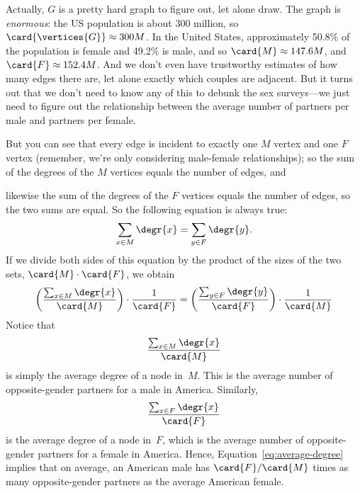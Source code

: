 Actually, $G$ is a pretty hard graph to figure out, let alone draw.  The
graph is \emph{enormous}: the US population is about 300 million, so
$\card{\vertices{G}} \approx 300M$.  In the United States, approximately
50.8\% of the population is female and 49.2\% is male, and so $\card{M}
\approx 147.6M$, and $\card{F} \approx 152.4M$.  And we don't even have
trustworthy estimates of how many edges there are, let alone exactly which
couples are adjacent.  But it turns out that we don't need to know any of
this to debunk the sex surveys---we just need to figure out the
relationship between the average number of partners per male and partners
per female.
\begin{editingnotes}
\end{editingnotes}
But you can see that every edge is incident
to exactly one $M$ vertex and one $F$ vertex (remember, we're only
considering male-female relationships); so the sum of the degrees of the
$M$ vertices equals the number of edges, and
\begin{editingnotes}
\end{editingnotes}
likewise
the sum of the degrees of the $F$ vertices equals the number of edges, so
the two sums are equal.  So the following equation is always true:
%
\[
\sum_{x \in M} \degr{x} = \sum_{y \in F} \degr{y}.
\]
%
If we divide both sides of this equation by the product of the sizes
of the two sets, $\card{M} \cdot \card{F}$, we obtain
%
\begin{equation}\label{eq:average-degree}
\left(\frac{\sum_{x \in M} \degr{x}}{\card{M}}\right) \cdot \frac{1}{\card{F}} =
\left(\frac{\sum_{y \in F} \degr{y}}{\card{F}}\right) \cdot \frac{1}{\card{M}}
\end{equation}
Notice that
\begin{equation*}
    \frac{\sum_{x \in M} \degr{x}}{\card{M}}
\end{equation*}
is simply the average degree of a node in~$M$.  This is the average
number of opposite-gender partners for a male in America.  Similarly,
\begin{equation*}
    \frac{\sum_{x \in F} \degr{x}}{\card{F}}
\end{equation*}
is the average degree of a node in~$F$, which is the average number of
opposite-gender partners for a female in America.  Hence,
Equation~\ref{eq:average-degree} implies that on average, an American
male has $\card{F}/\card{M}$ times as many opposite-gender partners as the
average American female.

